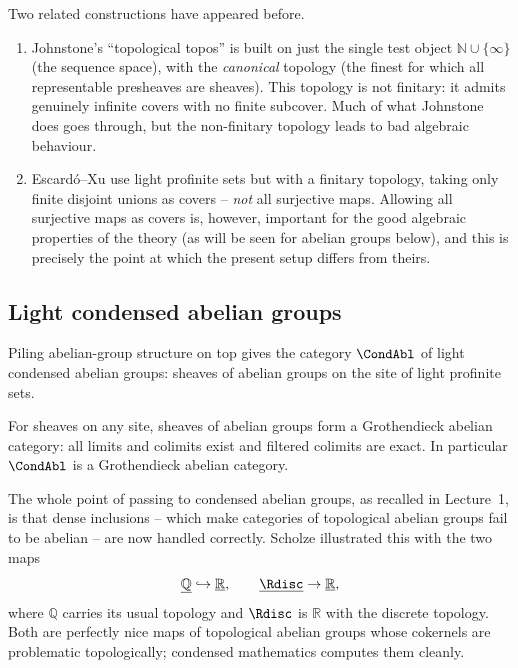 \begin{remark}
\label{rmk:2:johnstone-escardo}
Two related constructions have appeared before.
\begin{enumerate}
\item Johnstone's ``topological topos'' \cite{Johnstone_1979} is built on just the
single test object $\mathbb{N}\cup\{\infty\}$ (the sequence space), with the
\emph{canonical} topology (the finest for which all representable presheaves are
sheaves). This topology is not finitary: it admits genuinely infinite covers with
no finite subcover. Much of what Johnstone does goes through, but the
non-finitary topology leads to bad algebraic behaviour.
\item Escard\'o--Xu \cite{Escard__2016} use light profinite sets but with a
finitary topology, taking only finite disjoint unions as covers -- \emph{not}
all surjective maps. Allowing all surjective maps as covers is, however,
important for the good algebraic properties of the theory (as will be seen for
abelian groups below), and this is precisely the point at which the present
setup differs from theirs.
\end{enumerate}
\end{remark}

\subsection{Light condensed abelian groups}

Piling abelian-group structure on top gives the category
$\CondAbl$ of light condensed abelian groups: sheaves of abelian groups on the
site of light profinite sets.

\begin{proposition}
\label{prop:2:grothendieck}
For sheaves on any site, sheaves of abelian groups form a Grothendieck abelian
category: all limits and colimits exist and filtered colimits are exact.
In particular $\CondAbl$ is a Grothendieck abelian category.
\end{proposition}

The whole point of passing to condensed abelian groups, as recalled in Lecture~1,
is that dense inclusions -- which make categories of topological abelian groups
fail to be abelian -- are now handled correctly. Scholze illustrated this with
the two maps
\begin{equation*}
\underline{\mathbb{Q}}\hookrightarrow\underline{\mathbb{R}},
\qquad
\underline{\Rdisc}\to\underline{\mathbb{R}},
\end{equation*}
where $\mathbb{Q}$ carries its usual topology and $\Rdisc$ is $\mathbb{R}$ with
the discrete topology. Both are perfectly nice maps of topological abelian
groups whose cokernels are problematic topologically; condensed mathematics
computes them cleanly.

